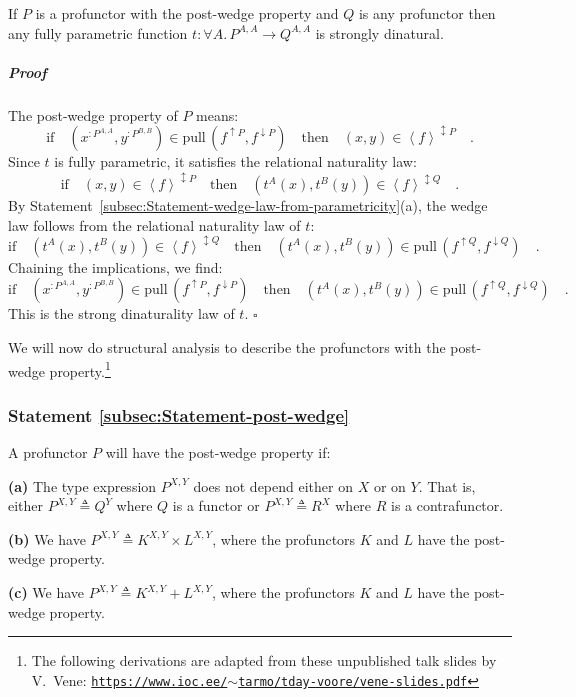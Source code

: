 If $P$ is a profunctor with the post-wedge property and $Q$ is any
profunctor then any fully parametric function $t:\forall A.\,P^{A,A}\rightarrow Q^{A,A}$
is strongly dinatural.

\subparagraph{Proof}

The post-wedge property of $P$ means:
\[
\text{if}\quad(x^{:P^{A,A}},y^{:P^{B,B}})\in\text{pull}\,(f^{\uparrow P},f^{\downarrow P})\quad\text{then}\quad(x,y)\in\left<f\right>^{\updownarrow P}\quad.
\]
Since $t$ is fully parametric, it satisfies the relational naturality
law:
\[
\text{if}\quad(x,y)\in\left<f\right>^{\updownarrow P}\quad\text{then}\quad(t^{A}(x),t^{B}(y))\in\left<f\right>^{\updownarrow Q}\quad.
\]
By Statement~\ref{subsec:Statement-wedge-law-from-parametricity}(a),
the wedge law follows from the relational naturality law of $t$:
\[
\text{if}\quad(t^{A}(x),t^{B}(y))\in\left<f\right>^{\updownarrow Q}\quad\text{then}\quad(t^{A}(x),t^{B}(y))\in\text{pull}\,(f^{\uparrow Q},f^{\downarrow Q})\quad.
\]
Chaining the implications, we find:
\[
\text{if}\quad(x^{:P^{A,A}},y^{:P^{B,B}})\in\text{pull}\,(f^{\uparrow P},f^{\downarrow P})\quad\text{then}\quad(t^{A}(x),t^{B}(y))\in\text{pull}\,(f^{\uparrow Q},f^{\downarrow Q})\quad.
\]
This is the strong dinaturality law of $t$. $\square$

We will now do structural analysis to describe the profunctors with
the post-wedge property.\footnote{The following derivations are adapted from these unpublished talk
slides by V.~Vene: \texttt{\href{https://www.ioc.ee/~tarmo/tday-voore/vene-slides.pdf}{https://www.ioc.ee/$\sim$tarmo/tday-voore/vene-slides.pdf}}} 

\subsubsection{Statement \label{subsec:Statement-post-wedge}\ref{subsec:Statement-post-wedge}}

A profunctor $P$ will have the post-wedge property if:

\textbf{(a)} The type expression $P^{X,Y}$ does not depend either
on $X$ or on $Y$. That is, either $P^{X,Y}\triangleq Q^{Y}$ where
$Q$ is a functor or $P^{X,Y}\triangleq R^{X}$ where $R$ is a contrafunctor. 

\textbf{(b)} We have $P^{X,Y}\triangleq K^{X,Y}\times L^{X,Y}$, where
the profunctors $K$ and $L$ have the post-wedge property.

\textbf{(c)} We have $P^{X,Y}\triangleq K^{X,Y}+L^{X,Y}$, where the
profunctors $K$ and $L$ have the post-wedge property.

